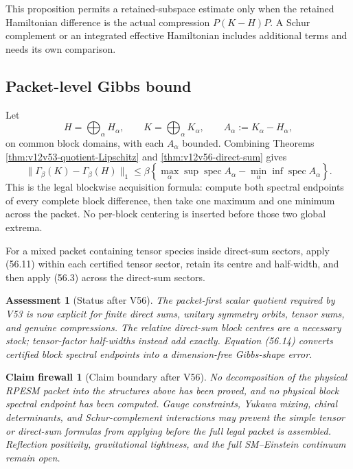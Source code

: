 \documentclass[11pt]{article}
\newtheorem{firewall}[theorem]{Claim firewall}
\newtheorem{assessment}[theorem]{Assessment}
\theoremstyle{remark}
\begin{document}
This proposition permits a retained-subspace estimate only when the
retained Hamiltonian difference is the actual compression
\(P(K-H)P\).  A Schur complement or an integrated effective
Hamiltonian includes additional terms and needs its own comparison.

\subsection{Packet-level Gibbs bound}

Let
\[
 H=\bigoplus_\alpha H_\alpha,\qquad
 K=\bigoplus_\alpha K_\alpha,
 \qquad
 A_\alpha:=K_\alpha-H_\alpha,
\]
on common block domains, with each \(A_\alpha\) bounded.  Combining
Theorems \ref{thm:v12v53-quotient-Lipschitz} and
\ref{thm:v12v56-direct-sum} gives
\begin{equation}
 \|\Gamma_\beta(K)-\Gamma_\beta(H)\|_1
 \leq
 \beta
 \left\{
 \max_\alpha\sup\operatorname{spec}A_\alpha
 -
 \min_\alpha\inf\operatorname{spec}A_\alpha
 \right\}.                                        \tag{56.14}
\end{equation}
This is the legal blockwise acquisition formula: compute both
spectral endpoints of every complete block difference, then take one
maximum and one minimum across the packet.  No per-block centering is
inserted before those two global extrema.

For a mixed packet containing tensor species inside direct-sum
sectors, apply (56.11) within each certified tensor sector, retain
its centre and half-width, and then apply (56.3) across the
direct-sum sectors.

\begin{assessment}[Status after V56]
\label{ass:v12v56-status}
The packet-first scalar quotient required by V53 is now explicit for
finite direct sums, unitary symmetry orbits, tensor sums, and genuine
compressions.  The relative direct-sum block centres are a necessary
stock; tensor-factor half-widths instead add exactly.  Equation
(56.14) converts certified block spectral endpoints into a
dimension-free Gibbs-shape error.
\end{assessment}

\begin{firewall}[Claim boundary after V56]
\label{fire:v12v56-claim}
No decomposition of the physical RPESM packet into the structures
above has been proved, and no physical block spectral endpoint has
been computed.  Gauge constraints, Yukawa mixing, chiral
determinants, and Schur-complement interactions may prevent the
simple tensor or direct-sum formulas from applying before the full
legal packet is assembled.  Reflection positivity, gravitational
tightness, and the full SM--Einstein continuum remain open.
\end{firewall}
\end{document}
